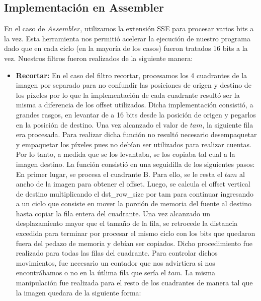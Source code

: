 \documentclass[10pt, a4paper]{article}
\begin{document}
\subsection{Implementación en Assembler}
En el caso de $Assembler$, utilizamos la extensión SSE para procesar varios bits a la vez. Esta herramienta nos permitió acelerar la ejecución de nuestro programa dado que en cada ciclo (en la mayoría de los casos) fueron tratados 16 bits a la vez.\newline
Nuestros filtros fueron realizados de la siguiente manera:
\begin{itemize}
\item {\textbf{Recortar:}}
En el caso del filtro recortar, procesamos los 4 cuadrantes de la imagen por separado para no confundir las posiciones de origen y destino de los píxeles por lo que la implementación de cada cuadrante resultó ser la misma a diferencia de los offset utilizados.\newline
Dicha implementación consistió, a grandes rasgos, en levantar de a 16 bits desde la posición de origen y pegarlos en la posición de destino. Una vez alcanzado el valor de $tam$, la siguiente fila era procesada.	\newline
Para realizar dicha función no resultó necesario desempaquetar y empaquetar los píxeles pues no debían ser utilizados para realizar cuentas. Por lo tanto, a medida que se los levantaba, se los copiaba tal cual a la imagen destino.\newline
\newline
La función consistió en una seguidilla de los siguientes pasos:\newline
En primer lugar, se procesa el cuadrante B. Para ello, se le resta el $tam$ al ancho de la imagen para obtener el offset. Luego, se calcula el offset vertical de destino multiplicando el dst\_row\_size por tam para continuar ingresando a un ciclo que consiste en mover la porción de memoria del fuente al destino hasta copiar la fila entera del cuadrante. Una vez alcanzado un desplazamiento mayor que el tamaño de la fila, se retrocede la distancia excedida para terminar por procesar el mismo ciclo con los bits que quedaron fuera del pedazo de memoria y debían ser copiados. Dicho procedimiento fue realizado para todas las filas del cuadrante. Para controlar dichos movimientos, fue necesario un contador que nos advirtiera si nos encontrábamos o no en la útlima fila que sería el $tam$.\newline
La misma manipulación fue realizada para el resto de los cuadrantes de manera tal que la imagen quedara de la siguiente forma:\newline


\end{itemize}
\end{document}
